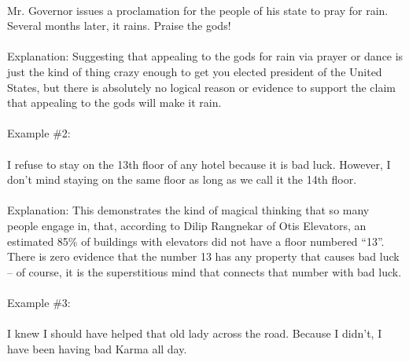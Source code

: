 \documentclass[a4paper,12pt,single,pdftex]{scrbook}
\begin{document}
    \\

    
      Mr. Governor issues a proclamation for the people of his state to pray for rain.  Several months later, it rains.  Praise the gods!
    \\

    
      
    \\

    
      Explanation: Suggesting that appealing to the gods for rain via prayer or dance is just the kind of thing crazy enough to get you elected president of the United States, but there is absolutely no logical reason or evidence to support the claim that appealing to the gods will make it rain.
    \\

    
      
    \\

    
      Example \#2:
    \\

    
      
    \\

    
      I refuse to stay on the 13th floor of any hotel because it is bad luck.  However, I don’t mind staying on the same floor as long as we call it the 14th floor.
    \\

    
      
    \\

    
      Explanation: This demonstrates the kind of magical thinking that so many people engage in, that, according to Dilip Rangnekar of Otis Elevators, an estimated 85\% of buildings with elevators did not have a floor numbered “13”.  There is zero evidence that the number 13 has any property that causes bad luck -- of course, it is the superstitious mind that connects that number with bad luck.
    \\

    
      
    \\

    
      Example \#3:
    \\

    
      
    \\

    
      I knew I should have helped that old lady across the road.  Because I didn’t, I have been having bad Karma all day.
    \\
\end{document}

